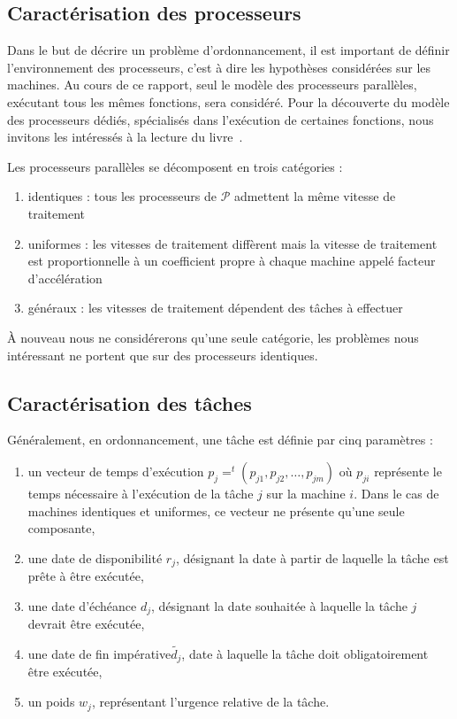 \documentclass[a4paper,9pt]{report}
\begin{document}
\subsection{Caractérisation des processeurs}

Dans le but de décrire un problème d'ordonnancement, il est important de définir l'environnement des
processeurs, c'est à dire les hypothèses considérées sur les machines. Au cours de ce rapport, seul
le modèle des processeurs parallèles, exécutant tous les mêmes fonctions, sera considéré. Pour la
découverte du modèle des processeurs dédiés, spécialisés dans l'exécution de certaines fonctions,
nous invitons les intéressés à la lecture du livre~\cite{blazewicz_handbook_2007}.

Les processeurs parallèles se décomposent en trois catégories :
\begin{enumerate}
    \item identiques : tous les processeurs de $\mathcal{P}$ admettent la même vitesse de traitement
    \item uniformes : les vitesses de traitement diffèrent mais la vitesse de traitement est
        proportionnelle à un coefficient propre à chaque machine appelé facteur d'accélération
    \item généraux : les vitesses de traitement dépendent des tâches à effectuer
\end{enumerate}

À nouveau nous ne considérerons qu'une seule catégorie, les problèmes nous intéressant ne portent
que sur des processeurs identiques.

\subsection{Caractérisation des tâches}

Généralement, en ordonnancement, une tâche est définie par cinq paramètres :
\begin{enumerate}
    \item un vecteur de temps d'exécution $p_j = ^t(p_{j1}, p_{j2}, \dots, p_{jm})$ où $p_{ji}$
        représente le temps nécessaire à l'exécution de la tâche $j$ sur la machine $i$. Dans le cas
        de machines identiques et uniformes, ce vecteur ne présente qu'une seule composante,
    \item une date de disponibilité $r_j$, désignant la date à partir de laquelle la tâche est prête
        à être exécutée,
    \item une date d'échéance $d_j$, désignant la date souhaitée à laquelle la tâche $j$ devrait
        être exécutée,
    \item une date de fin impérative$\widetilde{d_j}$, date à laquelle la tâche doit obligatoirement être exécutée,
    \item un poids $w_j$, représentant l'urgence relative de la tâche.
\end{enumerate}
\end{document}
